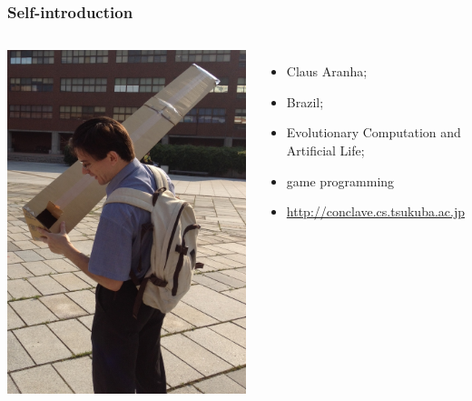\documentclass[aspectratio=169]{beamer}
\begin{document}
\begin{frame}
  \frametitle{Self-introduction}
  \begin{columns}
    \includegraphics[width=1\textwidth]{../img/pinhole}
           {\small
             \begin{itemize}
             \item {} Claus Aranha;
               \medskip

             \item {} Brazil;
               \medskip

             \item {} Evolutionary Computation and Artificial Life;
               \medskip

             \item {} game programming
               \medskip

             \item {}
               \url{http://conclave.cs.tsukuba.ac.jp}
             \end{itemize}
           }
  \end{columns}
\end{frame}
\end{document}
